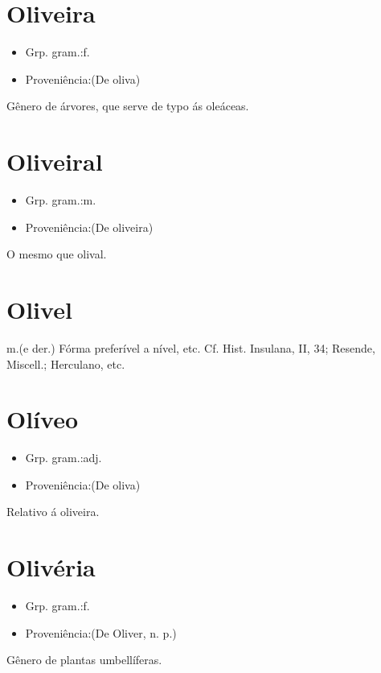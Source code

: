 \section{Oliveira}
\begin{itemize}
\item {Grp. gram.:f.}
\end{itemize}
\begin{itemize}
\item {Proveniência:(De \textunderscore oliva\textunderscore )}
\end{itemize}
Gênero de árvores, que serve de typo ás oleáceas.
\section{Oliveiral}
\begin{itemize}
\item {Grp. gram.:m.}
\end{itemize}
\begin{itemize}
\item {Proveniência:(De \textunderscore oliveira\textunderscore )}
\end{itemize}
O mesmo que \textunderscore olival\textunderscore .
\section{Olivel}
\textunderscore m.\textunderscore  (e der.)
Fórma preferível a \textunderscore nível\textunderscore , etc. Cf. \textunderscore Hist. Insulana\textunderscore , II, 34; Resende, \textunderscore Miscell.\textunderscore ; Herculano, etc.
\section{Olíveo}
\begin{itemize}
\item {Grp. gram.:adj.}
\end{itemize}
\begin{itemize}
\item {Proveniência:(De \textunderscore oliva\textunderscore )}
\end{itemize}
Relativo á oliveira.
\section{Olivéria}
\begin{itemize}
\item {Grp. gram.:f.}
\end{itemize}
\begin{itemize}
\item {Proveniência:(De \textunderscore Oliver\textunderscore , n. p.)}
\end{itemize}
Gênero de plantas umbellíferas.

